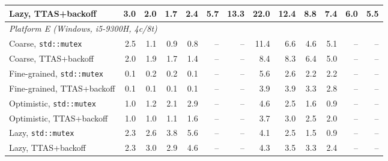 \begin{tabular}{lrrrrrrrrrrrr}
Lazy, TTAS+backoff & 3.0 & 2.0 & 1.7 & 2.4 & 5.7 & 13.3 & 22.0 & 12.4 & 8.8 & 7.4 & 6.0 & 5.5 \\
\midrule
\multicolumn{13}{l}{\emph{Platform E (Windows, i5-9300H, 4c/8t)}} \\
Coarse, \texttt{std::mutex} & 2.5 & 1.1 & 0.9 & 0.8 & -- & -- & 11.4 & 6.6 & 4.6 & 5.1 & -- & -- \\
Coarse, TTAS+backoff & 2.0 & 1.9 & 1.7 & 1.4 & -- & -- & 8.4 & 8.3 & 6.4 & 5.0 & -- & -- \\
Fine-grained, \texttt{std::mutex} & 0.1 & 0.2 & 0.2 & 0.1 & -- & -- & 5.6 & 2.6 & 2.2 & 2.2 & -- & -- \\
Fine-grained, TTAS+backoff & 0.1 & 0.1 & 0.1 & 0.1 & -- & -- & 3.9 & 3.9 & 3.3 & 2.8 & -- & -- \\
Optimistic, \texttt{std::mutex} & 1.0 & 1.2 & 2.1 & 2.9 & -- & -- & 4.6 & 2.5 & 1.6 & 0.9 & -- & -- \\
Optimistic, TTAS+backoff & 1.0 & 1.0 & 1.1 & 1.6 & -- & -- & 3.7 & 3.0 & 2.5 & 2.0 & -- & -- \\
Lazy, \texttt{std::mutex} & 2.3 & 2.6 & 3.8 & 5.6 & -- & -- & 4.1 & 2.5 & 1.5 & 0.9 & -- & -- \\
Lazy, TTAS+backoff & 2.3 & 3.0 & 2.9 & 4.6 & -- & -- & 4.3 & 3.5 & 3.3 & 2.4 & -- & -- \\
\bottomrule
\end{tabular}
